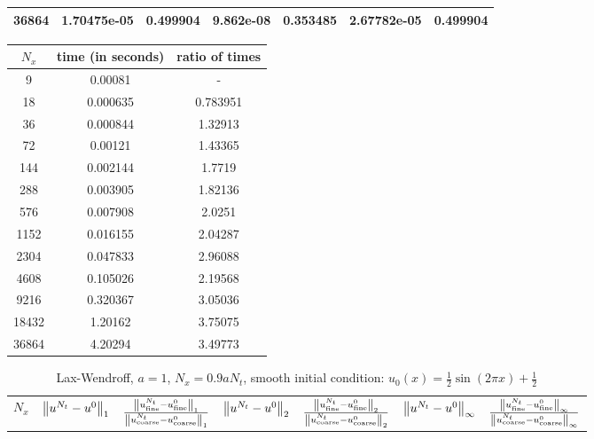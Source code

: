 \documentclass{article} %
\theoremstyle{plain}
\numberwithin{equation}{section} %
\numberwithin{figure}{section} %
\numberwithin{table}{section} %
\begin{document}
\begin{enumerate}[\ \ (a)]
\begin{table}[ht!]
\begin{tabular}{||c|c|c||c|c||c|c||}
             36864 & 1.70475e-05 & 0.499904 & 9.862e-08   & 0.353485 & 2.67782e-05 & 0.499904 \\
            \hline\hline
            \end{tabular}
        \end{table}
        \vspace{-0.25cm}
        \begin{table}[ht!]
            \centering
            \begin{tabular}{||c|c|c||}\hline\hline
               $N_x$ &   time (in seconds) &   ratio of times \\
            \hline
                 9 &            0.00081  &         -        \\
                18 &            0.000635 &         0.783951 \\
                36 &            0.000844 &         1.32913  \\
                72 &            0.00121  &         1.43365  \\
               144 &            0.002144 &         1.7719   \\
               288 &            0.003905 &         1.82136  \\
               576 &            0.007908 &         2.0251   \\
              1152 &            0.016155 &         2.04287  \\
              2304 &            0.047833 &         2.96088  \\
              4608 &            0.105026 &         2.19568  \\
              9216 &            0.320367 &         3.05036  \\
             18432 &            1.20162  &         3.75075  \\
             36864 &            4.20294  &         3.49773  \\
            \hline\hline
            \end{tabular}
        \end{table}
        \FloatBarrier
        \begin{table}[ht!]
            \caption*{Lax-Wendroff, $a = 1$, $N_x = 0.9aN_t$, smooth initial condition: $u_0(x) = \frac{1}{2}\sin(2\pi x) + \frac{1}{2}$}
            \centering
            \begin{tabular}{||c|c|c||c|c||c|c||}\hline\hline
               $N_x$ & $\norm{u^{N_t} - u^0}_1$ & $\frac{\norm{u_\text{fine}^{N_t} - u_\text{fine}^0}_1}{\norm{u_\text{coarse}^{N_t} - u_\text{coarse}^0}_1}$ & $\norm{u^{N_t} - u^0}_2$ & $\frac{\norm{u_\text{fine}^{N_t} - u_\text{fine}^0}_2}{\norm{u_\text{coarse}^{N_t} - u_\text{coarse}^0}_2}$ & $\norm{u^{N_t} - u^0}_\infty$ & $\frac{\norm{u_\text{fine}^{N_t} - u_\text{fine}^0}_\infty}{\norm{u_\text{coarse}^{N_t} - u_\text{coarse}^0}_\infty}$ \\

\end{tabular}
\end{table}
\end{enumerate}
\end{document}
